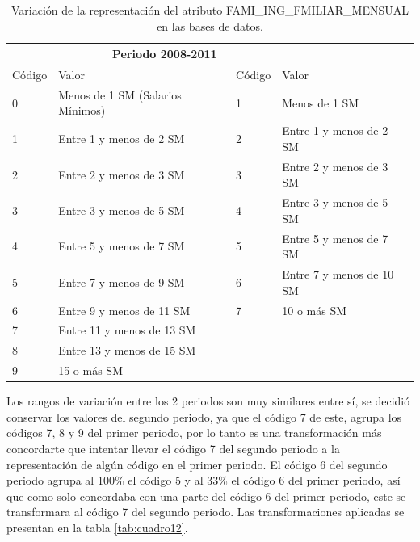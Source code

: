 \begin{itemize}
\begin{table}[!htb]
\centering
\begin{tabular}{|p{1.5cm}|p{6.5cm}|p{1.5cm}|p{6.5cm}|}
\hline
	\rowcolor[gray]{0.9} 
	\multicolumn{2}{|c|}{
	\textbf{Periodo 2000-2004I}} &
	\multicolumn{2}{|c|}{
	\textbf{Periodo 2008-2011}}\\
\hline
	\rowcolor[gray]{0.5}
	Código  & Valor &
	Código  & Valor \\
\hline
0 & Menos de 1 SM (Salarios Mínimos) & 1 & Menos de 1 SM\\
\hline
1 & Entre 1 y menos de 2 SM & 2 & Entre 1 y menos de 2 SM\\
\hline
2 & Entre 2 y menos de 3 SM & 3 & Entre 2 y menos de 3 SM\\
\hline
3 & Entre 3 y menos de 5 SM & 4 & Entre 3 y menos de 5 SM\\
\hline
4 & Entre 5 y menos de 7 SM & 5 & Entre 5 y menos de 7 SM\\
\hline
5 & Entre 7 y menos de 9 SM & 6 & Entre 7 y menos de 10 SM\\
\hline
6 & Entre 9 y menos de 11 SM & 7 & 10 o más SM\\
\hline
7 & Entre 11 y menos de 13 SM &  & \\ 
\hline
8 & Entre 13 y menos de 15 SM &  & \\
\hline
9 & 15 o más SM &  & \\
\hline
\end{tabular}
\caption{Variación de la representación del atributo FAMI\_ING\_FMILIAR\_MENSUAL en las bases de datos.}
\label{tab:cuadro11}
\end{table}
Los rangos de variación entre los 2 periodos son muy similares entre sí, se decidió conservar los valores del segundo periodo, ya que el código 7 de este, agrupa los códigos 7, 8 y 9 del primer periodo, por lo tanto es una transformación más concordarte que intentar llevar el código 7 del segundo periodo a la representación de algún código en el primer periodo. El código 6 del segundo periodo agrupa al 100\% el código 5 y al 33\% el código 6 del primer periodo, así que como solo concordaba con una parte del código 6 del primer periodo, este se transformara al código 7 del segundo periodo.
Las transformaciones aplicadas se presentan en la tabla \ref{tab:cuadro12}.


\end{itemize}
